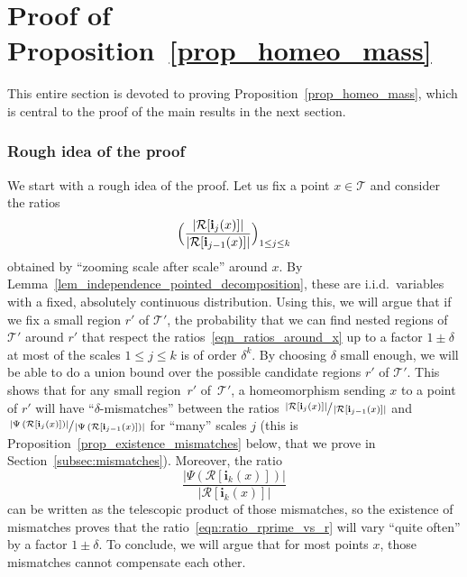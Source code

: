 \documentclass[11pt]{article}
\newcommand{\Tt}{\mathcal{T}}
\newcommand{\Rr}{\mathcal{R}}
\newcommand{\ii}{\mathbf{i}}
\newcommand{\ikx}{\ii_k(x)}
\newcommand{\ijx}{\ii_j(x)}
\theoremstyle{plain}
\theoremstyle{definition}
\numberwithin{equation}{section}
\begin{document}
\section{Proof of Proposition~\ref{prop_homeo_mass}} \label{sec:proof of prop homeo mass}
This entire section is devoted to proving Proposition~\ref{prop_homeo_mass}, which is central to the proof of the main results in the next section.

\subsubsection*{Rough idea of the proof}
We start with a rough idea of the proof.
Let us fix a point $x \in \Tt$ and consider the ratios
\begin{equation}\label{eqn_ratios_around_x}
\Bigl( \frac{\left| \Rr[\ijx] \right|}{\left| \Rr[\ii_{j-1}(x)] \right|} \Bigr)_{1 \leq j \leq k}
\end{equation}
obtained by ``zooming scale after scale'' around $x$. By Lemma~\ref{lem_independence_pointed_decomposition}, these are i.i.d.\ variables with a fixed, absolutely continuous distribution.
Using this, we will argue that if we fix a small region $r'$ of $\Tt'$, the probability that we can find nested regions of~$\Tt'$ around $r'$ that respect the ratios~\eqref{eqn_ratios_around_x} up to a factor $1\pm\delta$ at most of the scales $1 \leq j \leq k$ is of order $\delta^k$.
By choosing $\delta$ small enough, we will be able to do a union bound over the possible candidate regions $r'$ of $\Tt'$.
This shows that for any small region~$r'$ of~$\mathcal{T}'$, a homeomorphism sending $x$ to a point of $r'$ will have ``$\delta$-mismatches'' between the ratios $\sfrac{\left| \Rr[\ijx] \right|}{\left| \Rr[\ii_{j-1}(x)] \right|}$ and $\sfrac{\left| \Psi \left( \Rr[\ijx] \right) \right|}{\left| \Psi \left( \Rr[\ii_{j-1}(x)] \right) \right|}$ for ``many'' scales $j$ (this is Proposition~\ref{prop_existence_mismatches} below, that we prove in Section~\ref{subsec:mismatches}).
Moreover, the ratio
\begin{equation}\label{eqn:ratio_rprime_vs_r}
\frac{\left| \Psi \left( \Rr[\ikx] \right) \right|}{\left| \Rr[\ikx] \right|}
\end{equation}
can be written as the telescopic product of those mismatches, so the existence of mismatches proves that the ratio~\eqref{eqn:ratio_rprime_vs_r} will vary ``quite often'' by a factor $1\pm\delta$.
To conclude, we will argue that for most points $x$, those mismatches cannot compensate each other.
\end{document}
